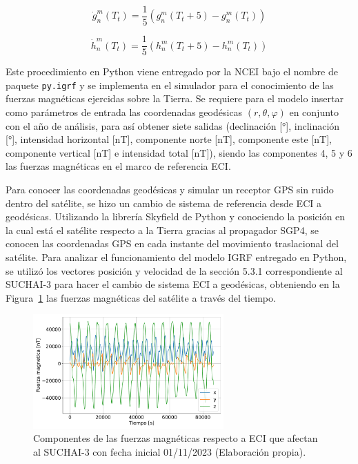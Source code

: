 \begin{equation}
	\dot{g}_n^m (T_t) = \frac{1}{5} \left( g_n^m (T_t+5) - g_n^m (T_t) \right)
\end{equation}

\begin{equation}
	\dot{h}_n^m (T_t) = \frac{1}{5} \left( h_n^m (T_t+5) - h_n^m (T_t) \right)
\end{equation}

Este procedimiento en Python viene entregado por la \gls{NCEI} \cite{ref40} bajo el nombre de paquete \texttt{py.igrf} y se implementa en el simulador para el conocimiento de las fuerzas magnéticas ejercidas sobre la Tierra. Se requiere para el modelo insertar como parámetros de entrada las coordenadas geodésicas $(r, \theta, \varphi)$ en conjunto con el año de análisis, para así obtener siete salidas (declinación [°], inclinación [°], intensidad horizontal [nT], componente norte [nT], componente este [nT], componente vertical [nT] e intensidad total [nT]), siendo las componentes 4, 5 y 6 las fuerzas magnéticas en el marco de referencia ECI.

Para conocer las coordenadas geodésicas y simular un receptor \gls{GPS} sin ruido dentro del satélite, se hizo un cambio de sistema de referencia desde ECI a geodésicas. Utilizando la librería Skyfield de Python y conociendo la posición en la cual está el satélite respecto a la Tierra gracias al propagador SGP4, se conocen las coordenadas \gls{GPS} en cada instante del movimiento traslacional del satélite. Para analizar el funcionamiento del modelo IGRF entregado en Python, se utilizó los vectores posición y velocidad de la sección 5.3.1 correspondiente al SUCHAI-3 para hacer el cambio de sistema ECI a geodésicas, obteniendo en la Figura~\ref{fig:bb} las fuerzas magnéticas del satélite a través del tiempo.


\begin{figure}[h]
	\centering    
	\includegraphics[width=0.65\textwidth]{bb.pdf}
	\caption{Componentes de las fuerzas magnéticas respecto a ECI que afectan al SUCHAI-3 con fecha inicial 01/11/2023 (Elaboración propia).}
	\label{fig:bb}
\end{figure}

